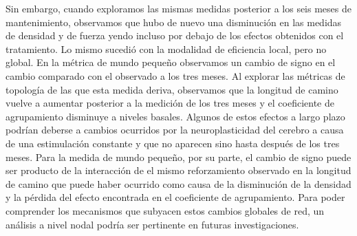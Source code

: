 Sin embargo, cuando exploramos las mismas medidas posterior a los seis meses de mantenimiento, observamos que hubo de nuevo una disminución en las medidas de densidad y de fuerza yendo incluso por debajo de los efectos obtenidos con el tratamiento. Lo mismo sucedió con la modalidad de eficiencia local, pero no global. En la métrica de mundo pequeño observamos un cambio de signo en el cambio comparado con el observado a los tres meses. Al explorar las métricas de topología de las que esta medida deriva, observamos que la longitud de camino vuelve a aumentar posterior a la medición de los tres meses y el coeficiente de agrupamiento disminuye a niveles basales. Algunos de estos efectos a largo plazo podrían deberse a cambios ocurridos por la neuroplasticidad del cerebro a causa de una estimulación constante y que no aparecen sino hasta después de los tres meses. Para la medida de mundo pequeño, por su parte, el cambio de signo puede ser producto de la interacción de el mismo reforzamiento observado en la longitud de camino \textemdash{}que puede haber ocurrido como causa de la disminución de la densidad\textemdash{} y la pérdida del efecto encontrada en el coeficiente de agrupamiento. Para poder comprender los mecanismos que subyacen estos cambios globales de red, un análisis a nivel nodal podría ser pertinente en futuras investigaciones.

